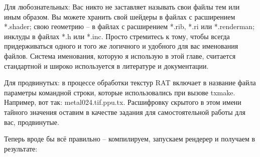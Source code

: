   

 Для
    любознательных: Вас никто не
    заставляет называть свои файлы тем или иным образом. Вы можете
    хранить свой шейдеры в файлах с расширением *.shader; свою
    геометрию – в файлах с расширением *.rib, *.ri или *.renderman;
    инклуды в файлах *.h или *.inc. Просто стремитесь к тому, чтобы
    всегда придерживаться одного и того же логичного и удобного для вас
    именования файлов. Система именования, которую я использую в этой
    главе, считается стандартной и широко используется в литературе и
    документации.
  

 Для
    продвинутых: в процессе обработки
    текстур RAT включает в название файла параметры командной строки,
    которые использовались при вызове txmake. Например, вот так:
    metal024.tif.ppu.tx. Расшифровку скрытого в этом имени тайного
    значения оставим в качестве задания для самостоятельной работы для
    вас, продвинутые.
  

 Теперь вроде бы всё правильно – компилируем,
    запускаем рендерер и получаем в результате:

